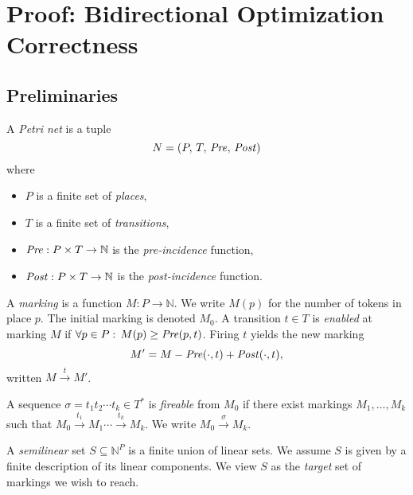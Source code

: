 
\section{Proof: Bidirectional Optimization Correctness}
\label{appendix:BidirectionalProof}

\subsection{Preliminaries}

\begin{definition}
	A \emph{Petri net} is a tuple
	\[
	N = (P,\,T,\,\mathit{Pre},\,\mathit{Post})
	\]
	where
	\begin{itemize}
		\item $P$ is a finite set of \emph{places},
		\item $T$ is a finite set of \emph{transitions},
		\item $\mathit{Pre}: P\times T \to \mathbb{N}$ is the \emph{pre-incidence} function,
		\item $\mathit{Post}: P\times T \to \mathbb{N}$ is the \emph{post-incidence} function.
	\end{itemize}
\end{definition}

\begin{definition}[Marking]
	A \emph{marking} is a function $M: P \to \mathbb{N}$. We write $M(p)$
	for the number of tokens in place $p$.  The initial marking is
	denoted $M_0$.  A transition $t\in T$ is \emph{enabled} at marking
	$M$ if $\forall p\in P:\,M(p)\ge\mathit{Pre}(p,t)$.  Firing $t$ yields the
	new marking
	\[
	M' = M - \mathit{Pre}(\cdot,t) + \mathit{Post}(\cdot,t),
	\]
	written $M \xrightarrow{t} M'$.
\end{definition}

\begin{definition}
	A sequence $\sigma = t_1 t_2 \cdots t_k \in T^*$ is \emph{fireable}
	from $M_0$ if there exist markings $M_1,\dots,M_k$ such that
	$M_0\xrightarrow{t_1}M_1\cdots\xrightarrow{t_k}M_k$.  We write
	$M_0 \xrightarrow{\sigma} M_k$.
\end{definition}

\begin{definition}
	A \emph{semilinear} set $S\subseteq \mathbb{N}^P$ is a finite union of
	linear sets.  We assume $S$ is given by a finite description of its
	linear components.  We view $S$ as the \emph{target} set of markings
	we wish to reach.
\end{definition}

